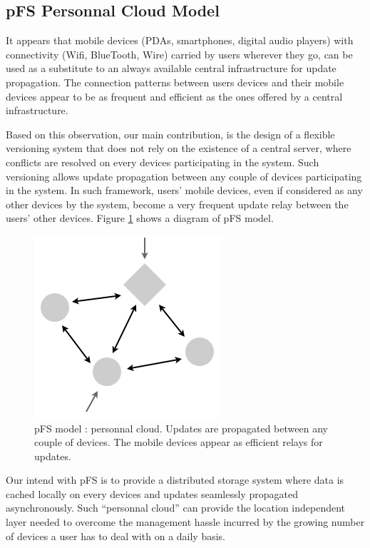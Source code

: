 \subsection {pFS Personnal Cloud Model}

It appears that mobile devices (PDAs, smartphones, digital audio
players) with connectivity (Wifi, BlueTooth, Wire) carried by users
wherever they go, can be used as a substitute to an always available
central infrastructure for update propagation. The connection patterns
between users devices and their mobile devices appear to be as
frequent and efficient as the ones offered by a central
infrastructure.

Based on this observation, our main contribution, is the design of a
flexible versioning system that does not rely on the existence of a
central server, where conflicts are resolved on every devices
participating in the system. Such versioning allows update propagation
between any couple of devices participating in the system. In such
framework, users' mobile devices, even if considered as any other
devices by the system, become a very frequent update relay between the
users' other devices. Figure \ref{PfsModel} shows a diagram of pFS model.

\begin{figure}[ht]
\begin{center}
  \includegraphics [scale=0.4] {img/pfs_model}
  \caption{\label{PfsModel} {\small pFS model : personnal
      cloud. Updates are propagated between any couple of
      devices. The mobile devices appear as efficient relays 
      for updates.}}
\end{center}
\end{figure}


Our intend with pFS is to provide a distributed storage system where
data is cached locally on every devices and updates seamlessly
propagated asynchronously. Such ``personnal cloud'' can provide the
location independent layer needed to overcome the management hassle
incurred by the growing number of devices a user has to deal with on a
daily basis.


